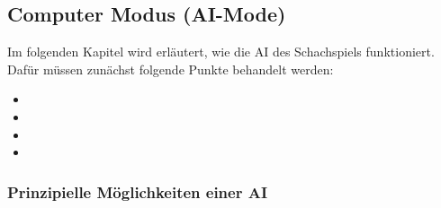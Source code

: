 \documentclass[12pt,a4paper]{article}
\begin{document}
\subsection{Computer Modus (AI-Mode)}
\label{SUBSEC:AI-MODE}

Im folgenden Kapitel wird erläutert, wie die AI des Schachspiels funktioniert. Dafür müssen zunächst folgende Punkte behandelt werden:

\begin{itemize}
	\item{}
	\item{}
	\item{}
	\item{}
\end{itemize}



\subsubsection{Prinzipielle Möglichkeiten einer AI}
\label{SUBSUBSEC:GenAI}
\end{document}
